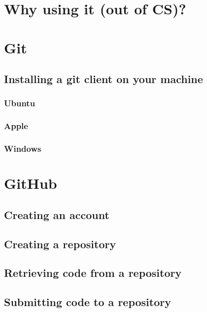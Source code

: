\documentclass[
]{book}
\begin{document}
\hypertarget{why-using-it-out-of-cs}{%
\section{Why using it (out of CS)?}\label{why-using-it-out-of-cs}}

\hypertarget{git}{%
\section{Git}\label{git}}

\hypertarget{installing-a-git-client-on-your-machine}{%
\subsection{Installing a git client on your machine}\label{installing-a-git-client-on-your-machine}}

\hypertarget{ubuntu}{%
\subsubsection{Ubuntu}\label{ubuntu}}

\hypertarget{apple}{%
\subsubsection{Apple}\label{apple}}

\hypertarget{windows}{%
\subsubsection{Windows}\label{windows}}

\hypertarget{github}{%
\section{GitHub}\label{github}}

\hypertarget{creating-an-account}{%
\subsection{Creating an account}\label{creating-an-account}}

\hypertarget{creating-a-repository}{%
\subsection{Creating a repository}\label{creating-a-repository}}

\hypertarget{retrieving-code-from-a-repository}{%
\subsection{Retrieving code from a repository}\label{retrieving-code-from-a-repository}}

\hypertarget{submitting-code-to-a-repository}{%
\subsection{Submitting code to a repository}\label{submitting-code-to-a-repository}}

  
\end{document}
